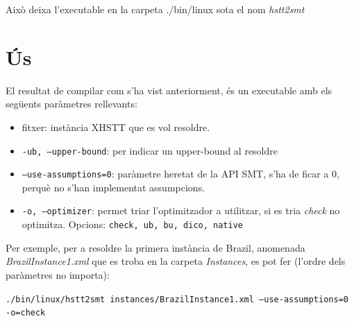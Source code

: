 \documentclass[11pt,a4paper,twoside]{report}
\begin{document}
  Això deixa l'executable en la carpeta ./bin/linux sota el nom \textit{hstt2smt}


  \section{Ús}
  
  El resultat de compilar com s'ha vist anteriorment, és un executable amb els següents paràmetres rellevants:
  \begin{itemize}
    \item fitxer: instància XHSTT que es vol resoldre.
    \item \texttt{-ub, --upper-bound}: per indicar un upper-bound al resoldre
    \item \texttt{--use-assumptions=0}: paràmetre heretat de la API SMT, s'ha de ficar a 0, perquè no s'han implementat assumpcions.
    \item \texttt{-o, --optimizer}: permet triar l'optimitzador a utilitzar, si es tria \textit{check} no optimitza. Opcions: \texttt{check, ub, bu, dico, native}
  \end{itemize}

  Per exemple, per a resoldre la primera instància de Brazil, anomenada \textit{BrazilInstance1.xml} que es troba en la carpeta \textit{Instances}, es pot fer (l'ordre dels paràmetres no importa):

  \begin{center}
    \texttt{./bin/linux/hstt2smt instances/BrazilInstance1.xml --use-assumptions=0 -o=check}
  \end{center}
  
  
\end{document}
